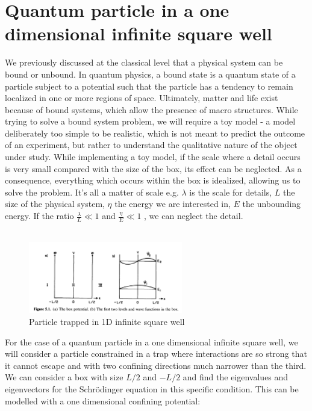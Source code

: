 \section{Quantum particle in a one dimensional infinite square well}
We previously discussed at the classical level that a physical system can be bound or unbound. 
In quantum physics, a bound state is a quantum state of a particle subject to a potential such that the particle has a tendency to remain localized in one or more regions of space. 
Ultimately, matter and life exist because of bound systems, which allow the presence of macro structures.
While trying to solve a bound system problem, we will require a toy model - a model deliberately too simple to be realistic, which is not meant to predict the outcome of an experiment, but rather to understand the qualitative nature of the object under study.
While implementing a toy model, if the scale where a detail occurs is very small compared with the size of the box, its effect can be neglected. 
As a consequence, everything which occurs within the box is idealized, allowing us to solve the problem. 
It's all a matter of scale e.g. $\lambda$ is the scale for details, $L$ the size of the physical system, $\eta$ the energy we are interested in, $E$ the unbounding energy.
If the ratio $\frac{\lambda}{L}\ll1$ and $\frac{\eta}{E}\ll1$ , we can neglect the detail.\\
\\
\begin{figure}[h!]
    \centering
    \includegraphics[clip, width=0.6\textwidth]{1D_well.png}
    \caption{\label{fig:1D_well} Particle trapped in 1D infinite square well}
\end{figure}
\noindent
For the case of a quantum particle in a one dimensional infinite square well, we will consider a particle constrained in a trap where interactions are so strong that it cannot escape and with two confining directions much narrower than the third. 
We can consider a box with size $L/2$ and $-L/2$ and find the eigenvalues and eigenvectors for the Schr\"odinger equation in this specific condition.
This can be modelled with a one dimensional confining potential:

